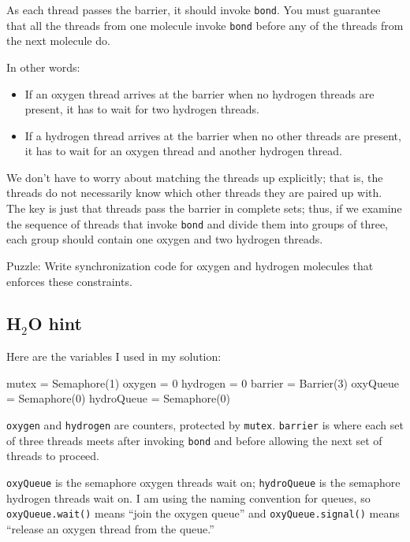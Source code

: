 \documentclass{book}
\begin{document}
As each thread passes the barrier, it should invoke
    {\tt bond}.  You must guarantee that all the threads
from one molecule invoke {\tt bond} before any of the threads
from the next molecule do.

In other words:

\begin{itemize}

    \item If an oxygen thread arrives at the barrier when no
          hydrogen threads are present, it has to wait for two
          hydrogen threads.

    \item If a hydrogen thread arrives at the barrier when
          no other threads are present, it has to wait for an
          oxygen thread and another hydrogen thread.

\end{itemize}

We don't have to worry about matching the threads up explicitly; that
is, the threads do not necessarily know which other threads they are
paired up with.  The key is just that threads pass the barrier in
complete sets; thus, if we examine the sequence of threads that invoke
    {\tt bond} and divide them into groups of three, each group should
contain one oxygen and two hydrogen threads.

Puzzle: Write synchronization code for oxygen and hydrogen
molecules that enforces these constraints.



\subsection {H$_2$O hint}

Here are the variables I used in my solution:

\begin{unbreakable}[title={Water building hint}]{}
mutex = Semaphore(1)
oxygen = 0
hydrogen = 0
barrier = Barrier(3)
oxyQueue = Semaphore(0)
hydroQueue = Semaphore(0)
\end{unbreakable}

{\tt oxygen} and {\tt hydrogen} are counters, protected by {\tt mutex}.
{\tt barrier} is where each set of three threads meets after
invoking {\tt bond} and before allowing the next set of threads
to proceed.

    {\tt oxyQueue} is the semaphore oxygen threads wait on;
{\tt hydroQueue} is the semaphore hydrogen threads wait on.
I am using the naming convention for queues, so
    {\tt oxyQueue.wait()} means ``join the oxygen queue'' and
    {\tt oxyQueue.signal()} means ``release an oxygen thread from
the queue.''
\end{document}

